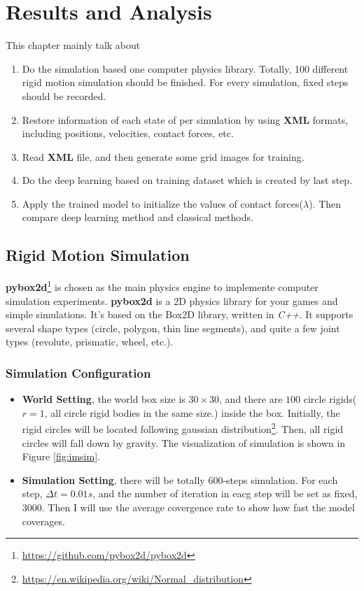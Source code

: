 \chapter{Results and Analysis}
\label{details}
This chapter mainly talk about 
\begin{enumerate}
    \item Do the simulation based one computer physics library. Totally, 100 different rigid motion simulation should be finished. For every simulation, fixed steps should be recorded.
    \item Restore information of each state of per simulation by using \textbf{XML} formats, including positions, velocities, contact forces, etc.
    \item Read \textbf{XML} file, and then generate some grid images for training.
    \item Do the deep learning based on training dataset which is created by last step.
    \item Apply the trained model to initialize the values of contact forces($\lambda$). Then compare deep learning method and classical methods.
\end{enumerate}

\section{Rigid Motion Simulation}

\textbf{pybox2d}\footnote{\url{https://github.com/pybox2d/pybox2d}} is chosen as the main physics engine to implemente computer simulation experiments. \textbf{pybox2d} is a 2D physics library for your games and simple simulations. It's based on the Box2D library, written in \textit{C++}. It supports several shape types (circle, polygon, thin line segments), and quite a few joint types (revolute, prismatic, wheel, etc.). 

\subsection{Simulation Configuration}
    \label{simconfig}
    \begin{itemize}
        \item \textbf{World Setting}, the world box size is $30\times30$,   and there are $100$ circle rigids($r=1$, all circle rigid bodies in the same size.) inside the box. Initially, the rigid circles will be located following gaussian distribution\footnote{\url{https://en.wikipedia.org/wiki/Normal_distribution}}. Then, all rigid circles will fall down by gravity. The visualization of simulation is shown in Figure \ref{fig:imsim}.
        \item \textbf{Simulation Setting}, there will be totally $600$-steps simulation. For each step, $\Delta t = 0.01s$, and the number of iteration in  eacg step will be set as fixed, $3000$. Then I will use the average covergence rate to show how fast the model coverages.
    \end{itemize}
